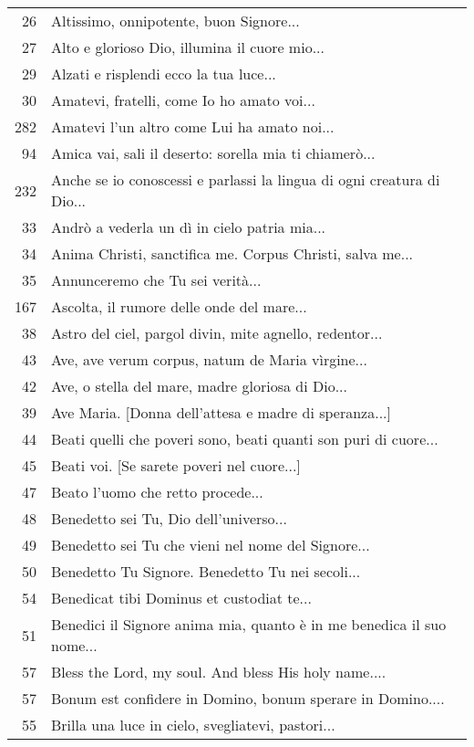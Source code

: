 {\begin{flushleft}
\begin{longtable}{r m{11cm}}
    26 & Altissimo, onnipotente, buon Signore...\\
    27 & Alto e glorioso Dio, illumina il cuore mio...\\
    29 & Alzati e risplendi ecco la tua luce...\\
    30 & Amatevi, fratelli, come Io ho amato voi...\\
    282 & Amatevi l'un altro come Lui ha amato noi...\\
    94 & Amica vai, sali il deserto: sorella mia ti chiamerò...\\
    232 & Anche se io conoscessi e parlassi la lingua di ogni creatura di Dio...\\
    33 & Andrò a vederla un dì in cielo patria mia...\\
    34 & Anima Christi, sanctifica me. Corpus Christi, salva me...\\
    35 & Annunceremo che Tu sei verità...\\
    167 & Ascolta, il rumore delle onde del mare...\\
    38 & Astro del ciel, pargol divin, mite agnello, redentor...\\
    43 & Ave, ave verum corpus, natum de Maria vìrgine...\\
    42 & Ave, o stella del mare, madre gloriosa di Dio...\\
    39 & Ave Maria. [Donna dell'attesa e madre di speranza...]\\
    44 & Beati quelli che poveri sono, beati quanti son puri di cuore...\\
    45 & Beati voi. [Se sarete poveri nel cuore...]\\
    47 & Beato l'uomo che retto procede...\\
    48 & Benedetto sei Tu, Dio dell'universo...\\
    49 & Benedetto sei Tu che vieni nel nome del Signore...\\
    50 & Benedetto Tu Signore. Benedetto Tu nei secoli...\\
    54 & Benedicat tibi Dominus et custodiat te...\\
    51 & Benedici il Signore anima mia, quanto è in me benedica il suo nome...\\
    57 & Bless the Lord, my soul. And bless His holy name....\\
    57 & Bonum est confidere in Domino, bonum sperare in Domino....\\
    55 & Brilla una luce in cielo, svegliatevi, pastori...\\

\end{longtable}
\end{flushleft}}
